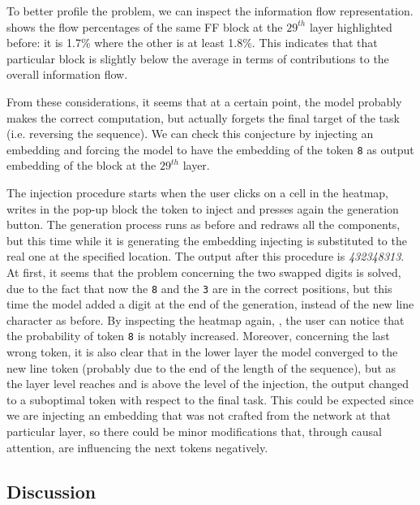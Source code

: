 {To better profile the problem, we can inspect the information flow representation.
shows the flow percentages of the same FF block at the $29^{th}$ layer highlighted before: it is 1.7\% where the other is at least 1.8\%.
This indicates that that particular block is slightly below the average in terms of contributions to the overall information flow.

From these considerations, it seems that at a certain point, the model probably makes the correct computation, but actually forgets the final target of the task (i.e. reversing the sequence).
We can check this conjecture by injecting an embedding and forcing the model to have the embedding of the token \texttt{8} as output embedding of the block at the $29^{th}$ layer.

The injection procedure starts when the user clicks on a cell in the heatmap, writes in the pop-up block the token to inject and presses again the generation button.
The generation process runs as before and redraws all the components, but this time while it is generating the embedding injecting is substituted to the real one at the specified location.
The output after this procedure is \emph{432348313}.
At first, it seems that the problem concerning the two swapped digits is solved, due to the fact that now the \texttt{8} and the \texttt{3} are in the correct positions, but this time the model added a digit at the end of the generation, instead of the new line character as before.
By inspecting the heatmap again,
, the user can notice that the probability of token \texttt{8} is notably increased.
Moreover, concerning the last wrong token, it is also clear that in the lower layer the model converged to the new line token (probably due to the end of the length of the sequence), but as the layer level reaches and is above the level of the injection, the output changed to a suboptimal token with respect to the final task.
This could be expected since we are injecting an embedding that was not crafted from the network at that particular layer, so there could be minor modifications that, through causal attention, are influencing the next tokens negatively.
}

\subsection{Discussion}



